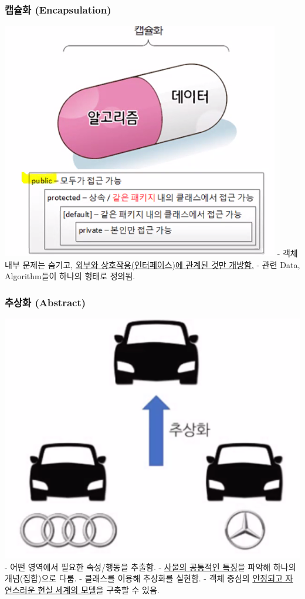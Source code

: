 \documentclass[a4paper,12pt]{article}
\begin{document}
\subsubsection{캡슐화 (Encapsulation)}
\includegraphics[scale=0.7]{54}
\newline
- 객체 내부 문제는 숨기고, \underline{외부와 상호작용(인터페이스)에 관계된 것만 개방함.}
\newline
- 관련 Data, Algorithm들이 하나의 형태로 정의됨.

\subsubsection{추상화 (Abstract)}
\includegraphics[scale=0.8]{55}
\newline
- 어떤 영역에서 필요한 속성/행동을 추출함.
\newline
- \underline{사물의 공통적인 특징}을 파악해 하나의 개념(집합)으로 다룸.
\newline
- 클래스를 이용해 추상화를 실현함.
\newline
- 객체 중심의 \underline{안정되고 자연스러운 현실 세계의 모델}을 구축할 수 있음.
\end{document}
